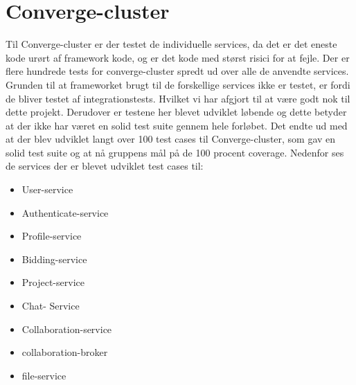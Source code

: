 \chapter{Converge-cluster}
Til Converge-cluster er der testet de individuelle services, da det er det eneste kode urørt af framework kode, og er det kode med størst risici for at fejle. Der er flere hundrede tests for converge-cluster spredt ud over alle de anvendte services. Grunden til at frameworket brugt til de forskellige services ikke er testet, er fordi de bliver testet af integrationstests. Hvilket vi har afgjort til at være godt nok til dette projekt. 
Derudover er testene her blevet udviklet løbende og dette betyder at der ikke har været en solid test suite gennem hele forløbet. Det endte ud med at der blev udviklet langt over 100 test cases til Converge-cluster, som gav en solid test suite og at nå gruppens mål på de 100 procent coverage. 
Nedenfor ses de services der er blevet udviklet test cases til:

\begin{itemize}
    \item User-service 
	\item Authenticate-service 
	\item Profile-service 
    \item Bidding-service 
	\item Project-service 
    \item Chat- Service 
	\item Collaboration-service 
	\item collaboration-broker
	\item file-service
    
\end{itemize}

